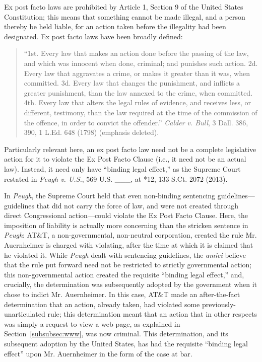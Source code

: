 \documentclass{article}
\begin{document}
	Ex post facto laws are prohibited by Article 1, Section 9 of the United States Constitution; this means that something cannot be made illegal, and a person thereby be held liable, for an action taken before the illegality had been designated. Ex post facto laws have been broadly defined:
	
	\begin{quote}
		\begin{singlespace}
			\fontsize{14}{17}\selectfont
		``1st. Every law that makes an action done before the passing of the law, and which was innocent when done, criminal; and punishes such action. 2d. Every law that aggravates a crime, or makes it greater than it was, when committed. 3d. Every law that changes the punishment, and inflicts a greater punishment, than the law annexed to the crime, when committed. 4th. Every law that alters the legal rules of evidence, and receives less, or different, testimony, than the law required at the time of the commission of the offence, in order to convict the offender.''  \emph{Calder v. Bull}, 3 Dall. 386, 390, 1 L.Ed. 648 (1798) (emphasis deleted).
		\end{singlespace}
	\end{quote}
	
	Particularly relevant here, an ex post facto law need not be a complete legislative action for it to violate the Ex Post Facto Clause (i.e., it need not be an actual law). Instead, it need only have ``binding legal effect,'' as the Supreme Court restated in \emph{Peugh v. U.S.}, 569 U.S. \_\_\_, at *12, 133 S.Ct. 2072 (2013). 
	
	In \emph{Peugh}, the Supreme Court held that even non-binding sentencing guidelines---guidelines that did not carry the force of law, and were not created through direct Congressional action---could violate the Ex Post Facto Clause. Here, the imposition of liability is actually more concerning than the stricken sentence in \emph{Peugh}: AT\&T, a non-governmental, non-neutral corporation, created the rule Mr. Auernheimer is charged with violating, after the time at which it is claimed that he violated it. While \emph{Peugh} dealt with sentencing guidelines, the \emph{amici} believe that the rule put forward need not be restricted to strictly governmental action; this non-governmental action created the requisite ``binding legal effect,'' and, crucially, the determination was subsequently adopted by the government when it chose to indict Mr. Auernheimer. In this case, AT\&T made an after-the-fact determination that an action, already taken, had violated some previously-unarticulated rule; this determination meant that an action that in other respects was simply a request to view a web page, as explained in Section~\ref{subsubsec:www}, was now criminal. This determination, and its subsequent adoption by the United States, has had the requisite ``binding legal effect'' upon Mr. Auernheimer in the form of the case at bar.
	
\end{document}
